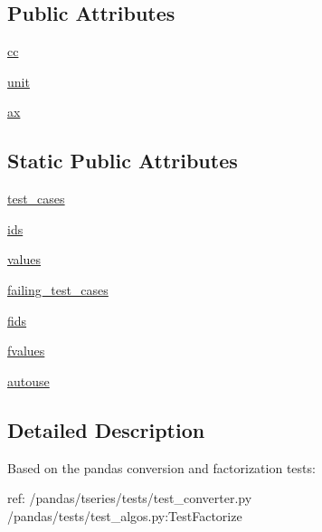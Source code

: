 \subsection*{Public Attributes}
\begin{DoxyCompactItemize}
\item 
\hyperlink{classmatplotlib_1_1tests_1_1test__category_1_1TestStrCategoryConverter_a26a06a1b04161730359b1d33c67ce4fd}{cc}
\item 
\hyperlink{classmatplotlib_1_1tests_1_1test__category_1_1TestStrCategoryConverter_ad9081a9671eec9b1fb835676d2997c62}{unit}
\item 
\hyperlink{classmatplotlib_1_1tests_1_1test__category_1_1TestStrCategoryConverter_a877b67f12e05d0e4f776aa654c775a14}{ax}
\end{DoxyCompactItemize}
\subsection*{Static Public Attributes}
\begin{DoxyCompactItemize}
\item 
\hyperlink{classmatplotlib_1_1tests_1_1test__category_1_1TestStrCategoryConverter_a38ccae99099fe39f80ca2935723b754d}{test\+\_\+cases}
\item 
\hyperlink{classmatplotlib_1_1tests_1_1test__category_1_1TestStrCategoryConverter_a9145e5708ad2650d1e0cdd69981ddefe}{ids}
\item 
\hyperlink{classmatplotlib_1_1tests_1_1test__category_1_1TestStrCategoryConverter_a0345e7e9d36e6251eb52e8831a117fdd}{values}
\item 
\hyperlink{classmatplotlib_1_1tests_1_1test__category_1_1TestStrCategoryConverter_ac271c632add17c40c34c259a85c85c8f}{failing\+\_\+test\+\_\+cases}
\item 
\hyperlink{classmatplotlib_1_1tests_1_1test__category_1_1TestStrCategoryConverter_ab2c7decff3432de479c077aa7c9cecb2}{fids}
\item 
\hyperlink{classmatplotlib_1_1tests_1_1test__category_1_1TestStrCategoryConverter_afeb32213f8171e1761a024bcc62ae521}{fvalues}
\item 
\hyperlink{classmatplotlib_1_1tests_1_1test__category_1_1TestStrCategoryConverter_af15e89e1880fac141e26e860edc5497b}{autouse}
\end{DoxyCompactItemize}


\subsection{Detailed Description}
\begin{DoxyVerb}Based on the pandas conversion and factorization tests:

ref: /pandas/tseries/tests/test_converter.py
     /pandas/tests/test_algos.py:TestFactorize
\end{DoxyVerb}
 

